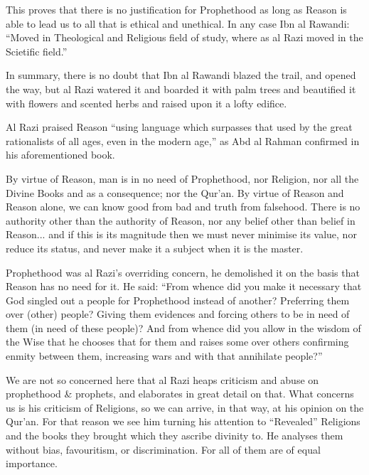 \documentclass[12pt]{book}
\begin{document}

This proves that there is no justification for Prophethood as long as Reason
is able to lead us to all that is ethical and unethical.
In any case Ibn al Rawandi:
“Moved in Theological and Religious field of study,
where as al Razi moved in the Scietific field.”\footnotemark


In summary, there is no doubt that Ibn al Rawandi blazed the trail,
and opened the way, but al Razi watered it and boarded it with palm trees
and beautified it with flowers and scented herbs
and raised upon it a lofty edifice.

Al Razi praised Reason “using language which surpasses that used by the
great rationalists of all ages, even in the modern age,”
as Abd al Rahman confirmed in his aforementioned book.

By virtue of Reason, man is in no need of Prophethood, nor Religion,
nor all the Divine Books and as a consequence; nor the Qur’an.
By virtue of Reason and Reason alone, we can know good from bad
and truth from falsehood.
There is no authority other than the authority of Reason,
nor any belief other than belief in Reason...
and if this is its magnitude then we must never minimise its value,
nor reduce its status, and never make it a subject when it is the master.

Prophethood was al Razi’s overriding concern, he demolished it on the basis
that Reason has no need for it.
He said: “From whence did you make it necessary that God singled out a people
for Prophethood instead of another?
Preferring them over (other) people?
Giving them evidences and forcing others to be in need of them
(in need of these people)?
And from whence did you allow in the wisdom of the Wise that he chooses
that for them and raises some over others confirming enmity between them,
increasing wars and with that annihilate people?”\footnotemark


We are not so concerned here that al Razi heaps criticism and abuse on
prophethood \& prophets, and elaborates in great detail on that.
What concerns us is his criticism of Religions, so we can arrive,
in that way, at his opinion on the Qur’an.
For that reason we see him turning his attention to “Revealed” Religions
and the books they brought which they ascribe divinity to.
He analyses them without bias, favouritism, or discrimination.
For all of them are of equal importance.\footnotemark
\end{document}
